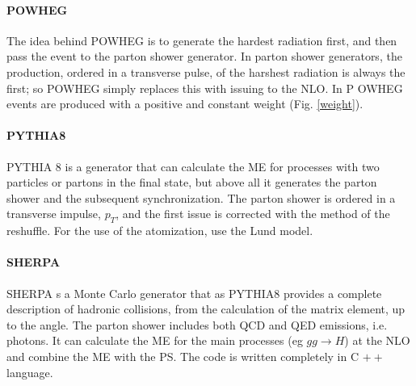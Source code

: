  
\paragraph{P{\footnotesize OWHEG}} The idea behind P{\footnotesize OWHEG} \cite{Oleari:2010nx} is to generate the hardest radiation first, and then pass the event to the parton shower generator. In parton shower generators, the production, ordered in a transverse pulse, of the harshest radiation is always the first; so P{\footnotesize OWHEG} simply replaces this with issuing to the NLO.
In P {\footnotesize OWHEG} events are produced with a positive and constant weight (Fig. \ref{weight}).
 
 
\paragraph{P{\footnotesize YTHIA}8 } P{\footnotesize YTHIA 8} \cite{bib:pythia} is a generator that can calculate the ME for processes with two particles or partons in the final state, but above all it generates the parton shower and the subsequent synchronization. The parton shower is ordered in a transverse impulse, $ p_T $, and the first issue is corrected with the method of the reshuffle. For the use of the atomization, use the Lund model.
 
 
\paragraph{S{\footnotesize HERPA}}  S{\footnotesize HERPA}  \cite{bib:sherpa} s a Monte Carlo generator that as PYTHIA8 provides a complete description of hadronic collisions, from the calculation of the matrix element, up to the angle. The parton shower includes both QCD and QED emissions, i.e. photons. It can calculate the ME for the main processes (eg $ gg \rightarrow H $) at the NLO and combine the ME with the PS. The code is written completely in C $ ++ $ language.


